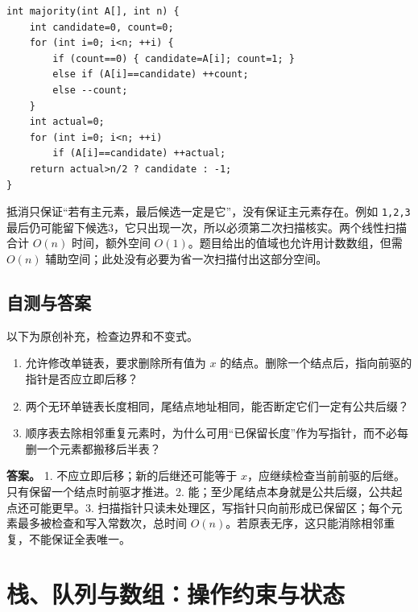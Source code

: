 \par\medskip\noindent
\begin{minipage}{\linewidth}
\begin{verbatim}
int majority(int A[], int n) {
    int candidate=0, count=0;
    for (int i=0; i<n; ++i) {
        if (count==0) { candidate=A[i]; count=1; }
        else if (A[i]==candidate) ++count;
        else --count;
    }
    int actual=0;
    for (int i=0; i<n; ++i)
        if (A[i]==candidate) ++actual;
    return actual>n/2 ? candidate : -1;
}
\end{verbatim}
\end{minipage}\par\medskip

抵消只保证``若有主元素，最后候选一定是它''，没有保证主元素存在。例如 \texttt{1,}\allowbreak{}\texttt{2,}\allowbreak{}\texttt{3} 最后仍可能留下候选3，它只出现一次，所以必须第二次扫描核实。两个线性扫描合计 \(O(n)\) 时间，额外空间 \(O(1)\)。题目给出的值域也允许用计数数组，但需 \(O(n)\) 辅助空间；此处没有必要为省一次扫描付出这部分空间。

\section{自测与答案}\label{ds-ch2-check}

以下为原创补充，检查边界和不变式。

\begin{enumerate}
\def\labelenumi{\arabic{enumi}.}
\tightlist
\item
  允许修改单链表，要求删除所有值为 \(x\) 的结点。删除一个结点后，指向前驱的指针是否应立即后移？
\item
  两个无环单链表长度相同，尾结点地址相同，能否断定它们一定有公共后缀？
\item
  顺序表去除相邻重复元素时，为什么可用``已保留长度''作为写指针，而不必每删一个元素都搬移后半表？
\end{enumerate}

\textbf{答案。} 1. 不应立即后移；新的后继还可能等于 \(x\)，应继续检查当前前驱的后继。只有保留一个结点时前驱才推进。2. 能；至少尾结点本身就是公共后缀，公共起点还可能更早。3. 扫描指针只读未处理区，写指针只向前形成已保留区；每个元素最多被检查和写入常数次，总时间 \(O(n)\)。若原表无序，这只能消除相邻重复，不能保证全表唯一。

\chapter{栈、队列与数组：操作约束与状态}\label{ds-ch3}

